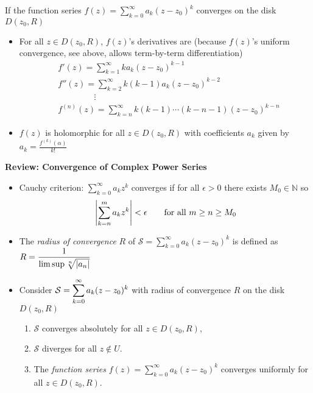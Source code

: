 \documentclass[11pt, a4paper]{article}
\begin{document}
If the function series $\displaystyle{f(z) = \sum_{k = 0}^{\infty} a_{k}(z - z_0)^{k}} $ converges on the disk $ D(z_0, R) $
\begin{itemize}
	\item For all $ z \in D(z_0, R) $,  $ f(z) $'s derivatives are (because $ f(z) $'s uniform convergence, see above, allows term-by-term differentiation)
	\begin{align*}
		&f'(z) = \sum_{k = 1}^{\infty}  k a_k (z - z_0)^{k-1}\\
		&f''(z) = \sum_{k = 2}^{\infty}  k (k-1) a_k (z - z_0)^{k-2}\\
		&\qquad \quad \quad \ \vdots\\
		&f^{(n)}(z) = \sum_{k = n}^{\infty}  k (k-1) \cdots (k - n - 1) (z - z_0)^{k-n}
	\end{align*}
	
	\item $ f(z) $ is holomorphic for all $ z \in D(z_0, R) $ with coefficients $ a_k  $ given by $ \displaystyle{	a_k = \frac{f^{(k)}(\alpha)}{k!}} $
	
\end{itemize}
\textbf{Review: Convergence of Complex Power Series}
\begin{itemize}
	\item Cauchy criterion: $\displaystyle{ \sum_{k = 0}^{\infty} a_{k}z^{k}} $ converges if for all $ \epsilon > 0 $ there exists $ M_0 \in \mathbb{N}$ so
	\begin{equation*}
		\abs{\sum_{k = n}^{m} a_k z^{k}} < \epsilon \qquad \text{for all } m \geq n \geq M_0
	\end{equation*}
	
	\item The \textit{radius of convergence} $ R $ of $\displaystyle{\mathcal{S} = \sum_{k = 0}^{\infty} a_{k}(z - z_0)^{k}} $ is defined as $ \displaystyle{R = \frac{1}{\limsup \sqrt[n]{\abs{a_n}}}} $
	
	\item Consider $\displaystyle{\mathcal{S} = \sum_{k = 0}^{\infty} a_{k}(z - z_0)^{k}} \vspace{0.5mm} $ with radius of convergence $ R $ on the  disk $ D(z_0, R) $
	\begin{enumerate}
		\item $ \mathcal{S} $ converges absolutely for all $ z \in D(z_0, R) $, 
		\item $ \mathcal{S} $ diverges for all $ z \notin U $.
		\item The \textit{function series} $ \displaystyle{f(z) = \sum_{k = 0}^{\infty} a_{k}(z - z_0)^{k}} $ converges uniformly for all $ z \in  D(z_0, R)$.
	\end{enumerate}
\end{itemize}
\end{document}
